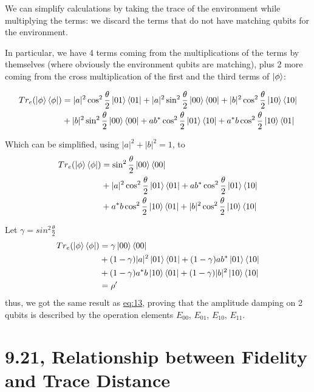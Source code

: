 \documentclass{masterthesis}
\begin{document}
We can simplify calculations by taking the trace of the environment while multiplying the terms: we discard the terms that do not have matching qubits for the environment.

In particular, we have 4 terms coming from the multiplications of the terms by themselves (where obviously the environment qubits are matching), plus 2 more coming from the cross multiplication of the first and the third terms of $\ket{\phi}$:

\begin{align}
    Tr_e(\ket{\phi}\bra{\phi}) &= |a|^2 \cos^2 \frac{\theta}{2}\ket{01}\bra{01} + |a|^2 \sin^2 \frac{\theta}{2}\ket{00}\bra{00} + |b|^2 \cos^2 \frac{\theta}{2}\ket{10}\bra{10} \\
    & + |b|^2 \sin^2 \frac{\theta}{2}\ket{00}\bra{00} + a b^{*} \cos^2 \frac{\theta}{2} \ket{01}\bra{10} + a^{*} b \cos^2 \frac{\theta}{2} \ket{10}\bra{01} 
\end{align}

Which can be simplified, using $|a|^2 + |b|^2 = 1$, to 
\begin{align}
    Tr_e(\ket{\phi}\bra{\phi}) &= \sin^2 \frac{\theta}{2}\ket{00}\bra{00} \\ 
    & + |a|^2 \cos^2 \frac{\theta}{2}\ket{01}\bra{01} + a b^{*} \cos^2 \frac{\theta}{2} \ket{01}\bra{10} \\
    & + a^{*} b \cos^2 \frac{\theta}{2} \ket{10}\bra{01} + |b|^2 \cos^2 \frac{\theta}{2}\ket{10}\bra{10}
\end{align}

Let $\gamma=sin^2\frac{\theta}{2}$
\begin{align}
    Tr_e(\ket{\phi}\bra{\phi}) &= \gamma\ket{00}\bra{00} \\ 
    & + (1-\gamma) |a|^2 \ket{01}\bra{01} + (1-\gamma) a b^{*} \ket{01}\bra{10} \\
    & + (1-\gamma) a^{*} b \ket{10}\bra{01} + (1-\gamma) |b|^2 \ket{10}\bra{10} \\
    &= \rho'
\end{align}
thus, we got the same result as \hyperref[eq:ad-dual-rail]{eq:13}, proving that the amplitude damping on 2 qubits is described by the operation elements \hyperref[eq:op-el-1]{$E_{00}$}, \hyperref[eq:op-el-2]{$E_{01}$}, \hyperref[eq:op-el-3]{$E_{10}$}, \hyperref[eq:op-el-4]{$E_{11}$}.

\newpage
\section*{9.21, Relationship between Fidelity and Trace Distance}
\end{document}
